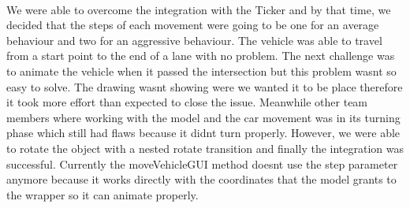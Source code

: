 \documentclass[a4paper]{article}
\begin{document}
\paragraph{}
We were able to overcome the integration with the Ticker and by that time, we decided that the steps of each movement were going to be one for an average behaviour and two for an aggressive behaviour. The vehicle was able to travel from a start point to the end of a lane with no problem. The next challenge was to animate the vehicle when it passed the intersection but this problem wasn\textsc{}t so easy to solve. The drawing wasn\textsc{}t showing were we wanted it to be place therefore it took more effort than expected to close the issue. Meanwhile other team members where working with the model and the car movement was in its turning phase which still had flaws because it didn\textsc{}t turn properly. However, we were able to rotate the object with a nested rotate transition and finally the integration was successful. Currently the moveVehicleGUI method doesn\textsc{}t use the step parameter anymore because it works directly with the coordinates that the model grants to the wrapper so it can animate properly.
\end{document}
